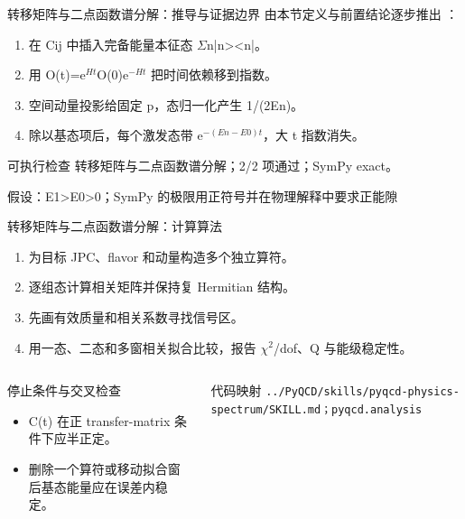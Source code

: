 \begin{frame}[t]{转移矩阵与二点函数谱分解：推导与证据边界}
\footnotesize
{}\quad 由本节定义与前置结论逐步推出 ：
\begin{enumerate}
\item 在 Cij 中插入完备能量本征态 \ensuremath{\Sigma}n|n><n|。
\item 用 O(t)=e\ensuremath{^{Ht}}O(0)e\ensuremath{^{-Ht}} 把时间依赖移到指数。
\item 空间动量投影给固定 p，态归一化产生 1/\allowbreak{}(2En)。
\item 除以基态项后，每个激发态带 e\ensuremath{^{-(En-E0)t}}，大 t 指数消失。
\end{enumerate}\begin{block}{可执行检查}
\quad 转移矩阵与二点函数谱分解；2/2 项通过；SymPy exact。
\par\scriptsize 假设：E1>E0>0；SymPy 的极限用正符号并在物理解释中要求正能隙
\end{block}
\end{frame}

\begin{frame}[t]{转移矩阵与二点函数谱分解：计算算法}
\footnotesize
{}\begin{enumerate}
\item 为目标 JPC、flavor 和动量构造多个独立算符。
\item 逐组态计算相关矩阵并保持复 Hermitian 结构。
\item 先画有效质量和相关系数寻找信号区。
\item 用一态、二态和多窗相关拟合比较，报告 \ensuremath{\chi}\ensuremath{^{2}}/\allowbreak{}dof、Q 与能级稳定性。
\end{enumerate}\begin{columns}[T,onlytextwidth]
\begin{block}{停止条件与交叉检查}\scriptsize\begin{itemize}
\item[\CheckMark] C(t) 在正 transfer-matrix 条件下应半正定。
\item[\CheckMark] 删除一个算符或移动拟合窗后基态能量应在误差内稳定。
\end{itemize}\end{block}
\begin{block}{代码映射}
\scriptsize \texttt{.\allowbreak{}.\allowbreak{}/\allowbreak{}PyQCD/\allowbreak{}skills/\allowbreak{}pyqcd-physics-spectrum/\allowbreak{}SKILL.\allowbreak{}md；pyqcd.\allowbreak{}analysis}
\end{block}\end{columns}\end{frame}

